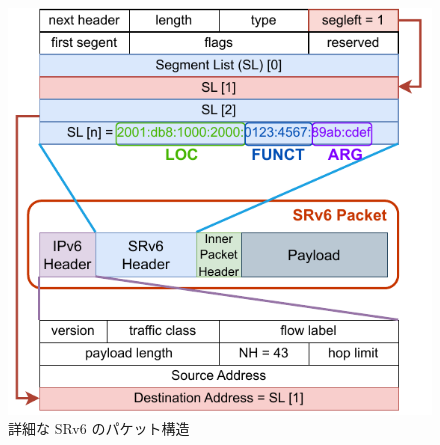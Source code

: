 \newpage
\begin{figure}[t]
    \centering
    \includegraphics[width=0.95\linewidth]{img/SRv6Packet.pdf}
    \caption{詳細な SRv6 のパケット構造}
    \label{fig:srv6-packet}
\end{figure}
